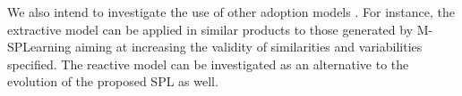 We also intend to investigate the use of other adoption models \cite{krueger02}. For instance, the extractive model can be applied in similar products to those generated by M-SPLear\allowbreak ning aiming at increasing the validity of similarities and variabilities specified. The reactive model can be investigated as an alternative to the evolution of the proposed SPL as well.
